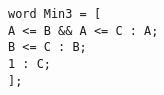 \documentclass{article}
\begin{document}
\texttt{word Min3 = [ \\
\hspace*{5mm}A <= B \&\& A <= C : A; \\
\hspace*{5mm}B <= C : B; \\
\hspace*{5mm}1 : C; \\
];
}
\end{document}
